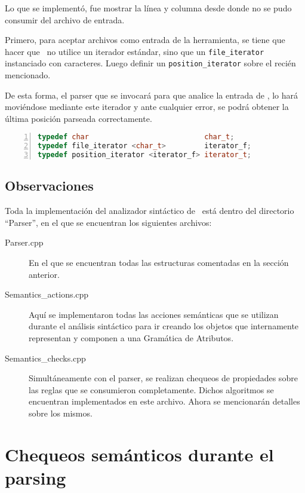 Lo que se implementó, fue mostrar la línea y columna desde donde no se pudo consumir del archivo de entrada.

Primero, para aceptar archivos como entrada de la herramienta, se tiene que hacer que \spirit\ no utilice un iterador estándar, sino que un \texttt{file\_iterator} instanciado con caracteres. Luego definir un \texttt{position\_iterator} sobre el recién mencionado.

De esta forma, el parser que se invocará para que analice la entrada de \maggen, lo hará moviéndose mediante este iterador y ante cualquier error, se podrá obtener la última posición parseada correctamente.

\begin{lstlisting}[language=C++, basicstyle=\scriptsize, numbers=left, numbersep=5pt, numberstyle=\tiny]
typedef char                           char_t;
typedef file_iterator <char_t>         iterator_f;
typedef position_iterator <iterator_f> iterator_t;
\end{lstlisting}

\subsection{Observaciones}

Toda la implementación del analizador sintáctico de \maggen\ está dentro del directorio ``Parser'', en el que se encuentran los siguientes archivos:

\begin{description}
\item [Parser.cpp] En el que se encuentran todas las estructuras comentadas en la sección anterior.

\item [Semantics\_actions.cpp] Aquí se implementaron todas las acciones semánticas que se utilizan durante el análisis sintáctico para ir creando los objetos que internamente representan y componen a una Gramática de Atributos.

\item [Semantics\_checks.cpp] Simultáneamente con el parser, se realizan chequeos de propiedades sobre las reglas que se consumieron completamente. Dichos algoritmos se encuentran implementados en este archivo. Ahora se mencionarán detalles sobre los mismos.
\end{description}

\section{Chequeos semánticos durante el parsing}

